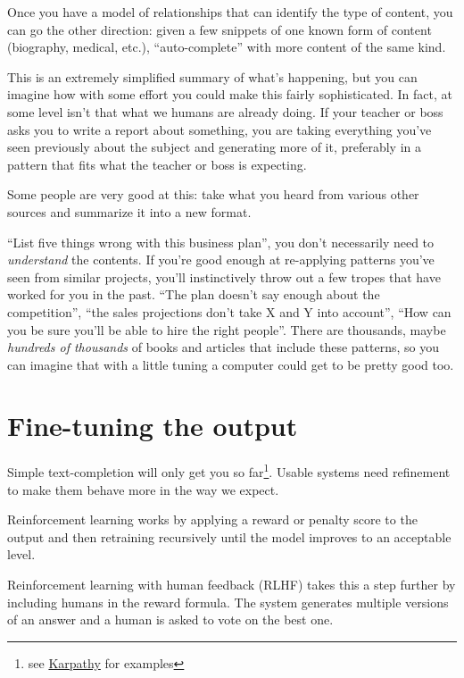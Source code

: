 \documentclass[
  Letterpaper,
]{scrbook}
\begin{document}
Once you have a model of relationships that can identify the type of
content, you can go the other direction: given a few snippets of one
known form of content (biography, medical, etc.), ``auto-complete'' with
more content of the same kind.

This is an extremely simplified summary of what's happening, but you can
imagine how with some effort you could make this fairly sophisticated.
In fact, at some level isn't that what we humans are already doing. If
your teacher or boss asks you to write a report about something, you are
taking everything you've seen previously about the subject and
generating more of it, preferably in a pattern that fits what the
teacher or boss is expecting.

Some people are very good at this: take what you heard from various
other sources and summarize it into a new format.

``List five things wrong with this business plan'', you don't
necessarily need to \emph{understand} the contents. If you're good
enough at re-applying patterns you've seen from similar projects, you'll
instinctively throw out a few tropes that have worked for you in the
past. ``The plan doesn't say enough about the competition'', ``the sales
projections don't take X and Y into account'', ``How can you be sure
you'll be able to hire the right people''. There are thousands, maybe
\emph{hundreds of thousands} of books and articles that include these
patterns, so you can imagine that with a little tuning a computer could
get to be pretty good too.

\section{Fine-tuning the output}\label{fine-tuning-the-output}

Simple text-completion will only get you so far\footnote{see
  \href{https://karpathy.ai/stateofgpt.pdf\#page=15}{Karpathy} for
  examples}. Usable systems need refinement to make them behave more in
the way we expect.

Reinforcement learning works by applying a reward or penalty score to
the output and then retraining recursively until the model improves to
an acceptable level.

Reinforcement learning with human feedback (RLHF) takes this a step
further by including humans in the reward formula. The system generates
multiple versions of an answer and a human is asked to vote on the best
one.
\end{document}
